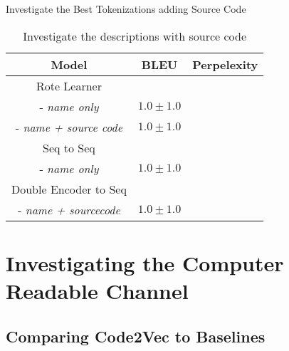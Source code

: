 Investigate the Best Tokenizations adding Source Code
\begin{table}[h!]
\begin{center}
\begin{tabular}{ c | c | c }
    Model                               & BLEU             & Perpelexity \\
    \hline
    \hline
    Rote Learner                        &                  & \\    
    - \textit{name only}                & $1.0 \pm 1.0 $   & \\
    - \textit{name + source code}       & $1.0 \pm 1.0 $   & \\
    \hline
    \hline
    Seq to Seq                          &                  &  \\
    - \textit{name only}                & $1.0 \pm 1.0 $   & \\
    \hline
    \hline
    Double Encoder to Seq               &                  &  \\
    - \textit{name + sourcecode}        & $1.0 \pm 1.0 $   & \\
    \hline
\end{tabular}
\caption {Investigate the descriptions with source code}
\label{table:human_source_code}
\end{center}
\end{table}





\section{Investigating the Computer Readable Channel} %
\label{sec:investigating_the_computer_channel}

\subsection{Comparing Code2Vec to Baselines} %
\label{sub:comparing_code2vec_to_baselines}


